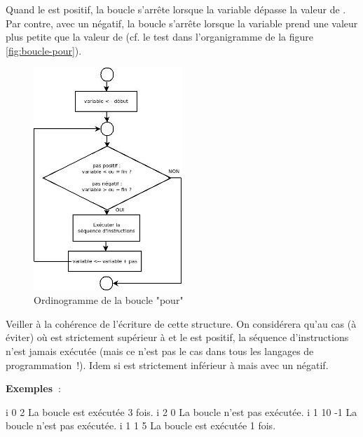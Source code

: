 		Quand le  est positif, la boucle s’arrête
		lorsque la variable dépasse la valeur de . 
		Par contre, avec un  négatif, 
		la boucle s’arrête lorsque la variable prend une valeur 
		plus petite que la valeur de 
		(cf. le test dans l’organigramme de la figure \vref{fig:boucle-pour}).

		\begin{figure}[h]
		\centering
		\includegraphics[width=0.5\textwidth]{image/boucle-pour}
		\caption{Ordinogramme de la boucle "pour"}
		\label{fig:boucle-pour}
		\end{figure}

		Veiller à la cohérence de l’écriture de cette structure. On considérera
		qu’au cas (à éviter) où  est strictement supérieur à
		 et le  est positif, la séquence d’instructions
		n’est jamais exécutée (mais ce n’est pas le cas dans tous les langages
		de programmation~!). Idem si  est strictement inférieur à
		 mais avec un  négatif.

		\textbf{Exemples~}:

		\begin{Pseudocode}
		\Stmt {} i  0  2  \RComment La boucle est exécutée 3 fois.
		\Stmt {} i  2  0  \RComment La boucle n’est pas exécutée.
		\Stmt {} i  1  10  -1  \RComment La boucle n’est pas exécutée.
		\Stmt {} i  1  1  5  \RComment La boucle est exécutée 1 fois.
		\end{Pseudocode}
		
